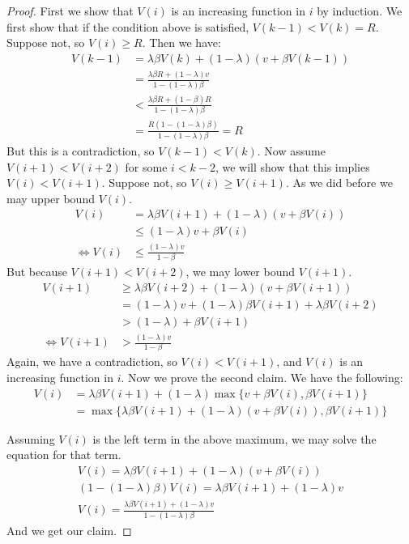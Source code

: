 \begin{proof}
First we show that $V(i)$ is an increasing function in $i$ by induction. We first show that if the condition above is satisfied, $V(k-1) < V(k) = R$. Suppose not, so $V(i) \geq R$. Then we have:
\begin{align*}
V(k-1) &= \lambda \beta V(k) + (1-\lambda)(v+\beta V(k-1)) \\
&= \frac{\lambda \beta R + (1-\lambda)v}{1-(1-\lambda)\beta} \\
&< \frac{\lambda \beta R + (1-\beta)R}{1-(1-\lambda)\beta} \\
&= \frac{R(1-(1-\lambda)\beta)}{1-(1-\lambda)\beta} = R
\end{align*}
But this is a contradiction, so $V(k-1) < V(k)$. Now assume $V(i+1) < V(i+2)$ for some $i < k-2$, we will show that this implies $V(i) < V(i+1)$. Suppose not, so $V(i) \geq V(i+1)$. As we did before we may upper bound $V(i)$.
\begin{align*}
V(i) &= \lambda \beta V(i+1) + (1-\lambda)(v+\beta V(i)) \\
&\leq (1-\lambda)v + \beta V(i) \\
\iff V(i) &\leq \frac{(1-\lambda)v}{1-\beta}
\end{align*}
But because $V(i+1) < V(i+2)$, we may lower bound $V(i+1)$.
\begin{align*}
V(i+1) &\geq \lambda \beta V(i+2) + (1-\lambda)(v+\beta V(i+1)) \\
&= (1-\lambda)v + (1-\lambda)\beta V(i+1) + \lambda \beta V(i+2) \\
&> (1-\lambda)+\beta V(i+1) \\
\iff V(i+1) &> \frac{(1-\lambda)v}{1-\beta}
\end{align*}
Again, we have a contradiction, so $V(i) < V(i+1)$, and $V(i)$ is an increasing function in $i$. Now we prove the second claim. We have the following:
\begin{align*}
V(i) &= \lambda \beta V(i+1) + (1-\lambda)\max\{v +\beta V(i), \beta V(i+1) \} \\
&= \max\{\lambda \beta V(i+1) + (1-\lambda)(v+\beta V(i)), \beta V(i+1) \}
\end{align*}

Assuming $V(i)$ is the left term in the above maximum, we may solve the equation for that term.
\begin{gather*}
V(i) = \lambda \beta V(i+1) + (1-\lambda)(v+\beta V(i)) \\
(1-(1-\lambda)\beta) V(i) = \lambda \beta V(i+1) + (1-\lambda)v \\
V(i) = \frac{\lambda \beta V(i+1) + (1-\lambda)v}{1-(1-\lambda)\beta}
\end{gather*}
And we get our claim.
\end{proof}

